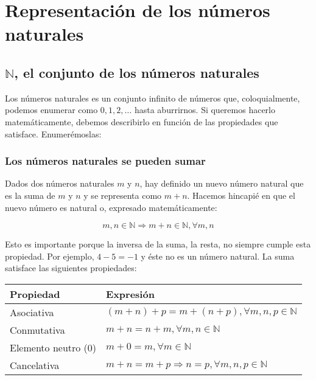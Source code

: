 \section{Representación de los números naturales}\label{representacion-numeros-naturales}

\subsection{$\mathbb{N}$, el conjunto de los números naturales}\label{el-conjunto-de-los-numeros-naturales}

Los números naturales es un conjunto infinito de números que, coloquialmente, podemos enumerar como $0,1,2,\ldots$ hasta aburrirnos.
Si queremos hacerlo matemáticamente, debemos describirlo en función de las propiedades que satisface.
Enumerémoslas:

\subsubsection{Los números naturales se pueden sumar}

Dados dos números naturales $m$ y $n$, hay definido un nuevo número natural que es la suma de $m$ y $n$ y se representa como $m+n$.
Hacemos hincapié en que el nuevo número es natural o, expresado matemáticamente:

\[m,n \in\mathbb{N} \Rightarrow m+n \in\mathbb{N}, \forall m,n\]

Esto es importante porque la inversa de la suma, la resta, no siempre cumple esta propiedad.
Por ejemplo, $4-5=-1$ y éste no es un número natural.
La suma satisface las siguientes propiedades:

\begin{center}
\begin{tabular}{l l}
	\textbf{Propiedad}  & \textbf{Expresión}                                       \\
	\toprule
	Asociativa          & $(m+n) + p = m + (n+p), \forall m,n,p \in\mathbb{N}$     \\
	Conmutativa         & $m+n = n+m, \forall m,n \in\mathbb{N}$                   \\
	Elemento neutro (0) & $m+0 = m, \forall m \in\mathbb{N}$                       \\
	Cancelativa         & $m+n = m+p \Rightarrow n=p, \forall m,n,p \in\mathbb{N}$ \\
\end{tabular}
\end{center}

